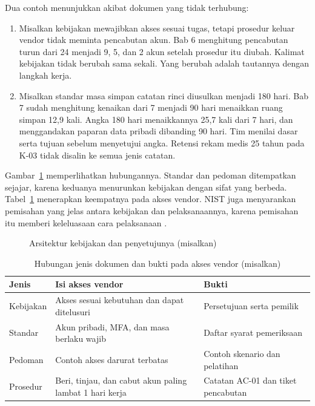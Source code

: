 Dua contoh menunjukkan akibat dokumen yang tidak terhubung:
\begin{enumerate}
  \item Misalkan kebijakan mewajibkan akses sesuai tugas, tetapi prosedur keluar vendor tidak
  meminta pencabutan akun. Bab 6 menghitung pencabutan turun dari 24 menjadi 9, 5, dan 2 akun
  setelah prosedur itu diubah. Kalimat kebijakan tidak berubah sama sekali. Yang berubah adalah
  tautannya dengan langkah kerja.
  \item Misalkan standar masa simpan catatan rinci diusulkan menjadi 180 hari. Bab 7 sudah
  menghitung kenaikan dari 7 menjadi 90 hari menaikkan ruang simpan 12,9 kali. Angka 180 hari
  menaikkannya 25,7 kali dari 7 hari, dan menggandakan paparan data pribadi dibanding 90 hari. Tim
  menilai dasar serta tujuan sebelum menyetujui angka. Retensi rekam medis 25 tahun pada K-03
  tidak disalin ke semua jenis catatan.
\end{enumerate}

Gambar~\ref{fig:ch08-hierarki} memperlihatkan hubungannya. Standar dan pedoman ditempatkan sejajar,
karena keduanya menurunkan kebijakan dengan sifat yang berbeda. Tabel~\ref{tab:ch08-kebijakan}
menerapkan keempatnya pada akses vendor. NIST juga menyarankan pemisahan yang jelas antara
kebijakan dan pelaksanaannya, karena pemisahan itu memberi keleluasaan cara pelaksanaan
\cite{c08-nist-sp80012r1}.

\begin{figure}[!htb]
  \centering
  
  \caption{Arsitektur kebijakan dan penyetujunya (misalkan)}
  \label{fig:ch08-hierarki}
\end{figure}

\begin{table}[!htb]
  \centering\small
  \caption{Hubungan jenis dokumen dan bukti pada akses vendor (misalkan)}
  \label{tab:ch08-kebijakan}
  \begin{tabularx}{\textwidth}{|>{\raggedright\arraybackslash}p{}|>{\raggedright\arraybackslash}X|>{\raggedright\arraybackslash}X|}
    \hline
    \textbf{Jenis} & \textbf{Isi akses vendor} & \textbf{Bukti} \\ \hline
    Kebijakan & Akses sesuai kebutuhan dan dapat ditelusuri & Persetujuan serta pemilik \\ \hline
    Standar & Akun pribadi, MFA, dan masa berlaku wajib & Daftar syarat pemeriksaan \\ \hline
    Pedoman & Contoh akses darurat terbatas & Contoh skenario dan pelatihan \\ \hline
    Prosedur & Beri, tinjau, dan cabut akun paling lambat 1 hari kerja & Catatan AC-01 dan tiket
    pencabutan \\ \hline
  \end{tabularx}
\end{table}

